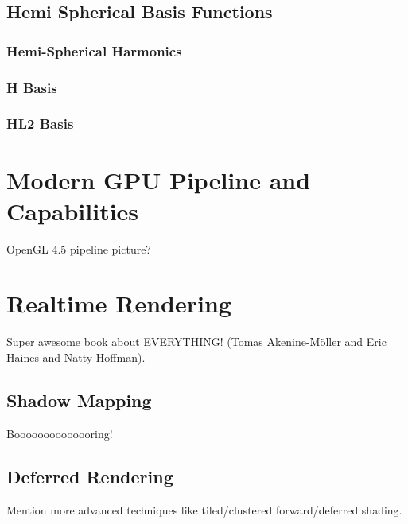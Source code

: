 \documentclass[thesis.tex]{subfiles}
\begin{document}
\subsection{Hemi Spherical Basis Functions}
\subsubsection{Hemi-Spherical Harmonics}
\subsubsection{H Basis}
\subsubsection{HL2 Basis}

\section{Modern GPU Pipeline and Capabilities}
OpenGL 4.5 pipeline picture?


\section{Realtime Rendering}
Super awesome book about EVERYTHING! \cite{bib:RealtimeRenderingBook} (Tomas Akenine-M\"{o}ller and Eric Haines and Natty Hoffman).

\subsection{Shadow Mapping}
Boooooooooooooring!

\subsection{Deferred Rendering}
Mention more advanced techniques like tiled/clustered forward/deferred shading.

\subfilebib %
\end{document}
